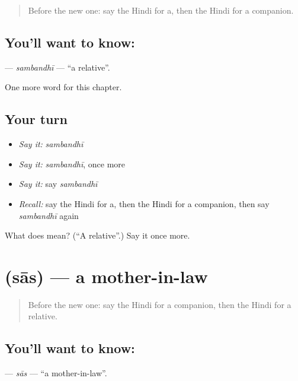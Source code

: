 \label{lesson:HI-C254-sambandhi}



\begin{quote}
Before the new one: say the Hindi for a, then the Hindi for a companion.
\end{quote}

\subsection*{You'll want to know: }
\textbf{} — \emph{sambandhī} — \textquotedblleft{}a relative\textquotedblright{}.

\begin{grammarlens}[title={What you've built}]
One more word for this chapter.
\end{grammarlens}

\subsection*{Your turn}
\begin{itemize}
\raggedright
  \item \emph{Say it:} \emph{sambandhī}
  \item \emph{Say it:} \emph{sambandhī}, once more
  \item \emph{Say it:} say \emph{sambandhī}
  \item \emph{Recall:} say the Hindi for a, then the Hindi for a companion, then say \emph{sambandhī} again
\end{itemize}

\begin{tcolorbox}[breakable,colback=teal!4,colframe=teal!35!black,title={Before you move on}]
What does  mean? (\textquotedblleft{}A relative\textquotedblright{}.) Say it once more.
\end{tcolorbox}
\section[\texorpdfstring{\hi{सास} (sās)}{सास (sās)}]{ (sās) — a mother-in-law}

\label{lesson:HI-C254-sas}



\begin{quote}
Before the new one: say the Hindi for a companion, then the Hindi for a relative.
\end{quote}

\subsection*{You'll want to know: }
\textbf{} — \emph{sās} — \textquotedblleft{}a mother-in-law\textquotedblright{}.

